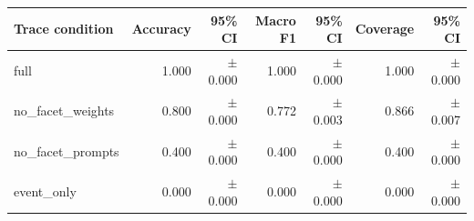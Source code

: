 \begin{tabular}{lrrrrrr}
\toprule
Trace condition & Accuracy & 95\% CI & Macro F1 & 95\% CI & Coverage & 95\% CI \\
\midrule
full & 1.000 & $\pm$ 0.000 & 1.000 & $\pm$ 0.000 & 1.000 & $\pm$ 0.000 \\
no\_facet\_weights & 0.800 & $\pm$ 0.000 & 0.772 & $\pm$ 0.003 & 0.866 & $\pm$ 0.007 \\
no\_facet\_prompts & 0.400 & $\pm$ 0.000 & 0.400 & $\pm$ 0.000 & 0.400 & $\pm$ 0.000 \\
event\_only & 0.000 & $\pm$ 0.000 & 0.000 & $\pm$ 0.000 & 0.000 & $\pm$ 0.000 \\
\bottomrule
\end{tabular}
